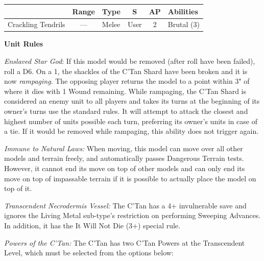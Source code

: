 \begin{minipage}[t]{0.72\textwidth}
	\begin{tabular}{L{90 pt} c C{40pt} *{2}{c} >{\raggedright\arraybackslash}p{130pt}}
		& Range & Type & S & AP & Abilities \\
		\hline
		Crackling Tendrils & — & Melee & User & 2 & Brutal (3)  \\
	\end{tabular}
	
	
	\vspace*{2em}
	\textbf{Unit Rules}
		
	\textit{Enslaved Star God}: If this model would be removed (after  roll have been failed), roll a D6. On a 1, the shackles of the C'Tan Shard have been broken and it is now \textit{rampaging}. The opposing player returns the model to a point within 3" of where it dies with 1 Wound remaining. While rampaging, the C'Tan Shard is considered an enemy unit to all players and takes its turns at the beginning of its owner's turns use the standard rules. It will attempt to attack the closest and highest number of units possible each turn, preferring its owner's units in case of a tie. If it would be removed while rampaging, this ability does not trigger again.
	
	\textit{Immune to Natural Laws:} When moving, this model can move over all other models and terrain freely, and automatically passes Dangerous Terrain tests. However, it cannot end its move on top of other models and can only end its move on top of impassable terrain if it is possible to actually place the model on top of it.
	
	\textit{Transcendent Necrodermis Vessel:} The C'Tan has a 4+ invulnerable save and ignores the Living Metal sub-type's restriction on performing Sweeping Advances. In addition, it has the It Will Not Die (3+) special rule.
	
	\textit{Powers of the C'Tan:} The C'Tan has two C'Tan Powers at the Transcendent Level, which must be selected from the options below:
	

\end{minipage}
